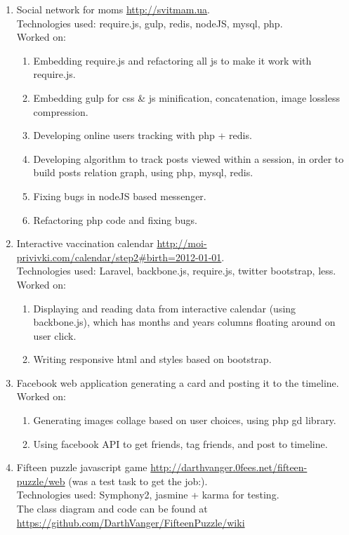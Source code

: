 \documentclass[a4paper, 14pt]{article}
\begin{document}
    \begin{enumerate}
        \item Social network for moms \url{http://svitmam.ua}. \\
            Technologies used: require.js, gulp, redis, nodeJS, mysql, php. \\
            Worked on: 
            \begin{enumerate}
                \item Embedding require.js and refactoring all js to make it work with require.js.
                \item Embedding gulp for css \& js minification, concatenation, image lossless compression. 
                \item Developing online users tracking with php + redis.
                \item Developing algorithm to track posts viewed within a session, in order to build posts relation graph, using php, mysql, redis.
                \item Fixing bugs in nodeJS based messenger.
                \item Refactoring php code and fixing bugs.
            \end{enumerate}
        \item Interactive vaccination calendar \url{http://moi-privivki.com/calendar/step2#birth=2012-01-01}. \\
            Technologies used: Laravel, backbone.js, require.js, twitter bootstrap, less. \\
            Worked on:
            \begin{enumerate}
                \item Displaying and reading data from interactive calendar (using backbone.js), which has months and years columns floating around on user click.
                \item Writing responsive html and styles based on bootstrap.
            \end{enumerate}
        \item Facebook web application generating a card and posting it to the timeline.
            Worked on:
            \begin{enumerate}
                \item Generating images collage based on user choices, using php gd library.
                \item Using facebook API to get friends, tag friends, and post to timeline.
            \end{enumerate}
        \item Fifteen puzzle javascript game \url{http://darthvanger.0fees.net/fifteen-puzzle/web} (was a test task to get the job:). \\
            Technologies used: Symphony2, jasmine + karma for testing. \\
            The class diagram and code can be found at \\
            \url{https://github.com/DarthVanger/FifteenPuzzle/wiki}
    \end{enumerate}
\end{document}
